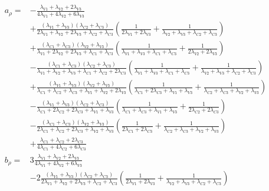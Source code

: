 {\small
\begin{align*}
    a_{\rho}=&-\frac{\lambda_{V1}+\lambda_{V2}+2\lambda_{V3}}{4\lambda_{V1}+4\lambda_{V2}+6\lambda_{V3}}\\
    &+\frac{\left(\lambda_{V1}+\lambda_{V3}\right)\left(\lambda_{C2}+\lambda_{C3}\right)}{2\lambda_{V1}+\lambda_{V2}+2\lambda_{V3}+\lambda_{C2}+\lambda_{C3}}\left(\frac{1}{2\lambda_{V1}+2\lambda_{V3}}+\frac{1}{\lambda_{V2}+\lambda_{V3}+\lambda_{C2}+\lambda_{C3}}\right)\\
    &+\frac{\left(\lambda_{C1}+\lambda_{C3}\right)\left(\lambda_{V2}+\lambda_{V3}\right)}{\lambda_{V1}+2\lambda_{V2}+2\lambda_{V3}+\lambda_{C1}+\lambda_{C3}}\left(\frac{1}{\lambda_{V1}+\lambda_{V3}+\lambda_{C1}+\lambda_{C3}}+\frac{1}{2\lambda_{V2}+2\lambda_{V3}}\right)\\
    &-\frac{\left(\lambda_{C1}+\lambda_{C3}\right)\left(\lambda_{C2}+\lambda_{C3}\right)}{\lambda_{V1}+\lambda_{V2}+\lambda_{V3}+\lambda_{C1}+\lambda_{C2}+2\lambda_{C3}}\left(\frac{1}{\lambda_{V1}+\lambda_{V3}+\lambda_{C1}+\lambda_{C3}}+\frac{1}{\lambda_{V2}+\lambda_{V3}+\lambda_{C2}+\lambda_{C3}}\right)\\
    &+\frac{\left(\lambda_{V1}+\lambda_{V3}\right)\left(\lambda_{V2}+\lambda_{V3}\right)}{\lambda_{C1}+\lambda_{C2}+\lambda_{C3}+\lambda_{V1}+\lambda_{V2}+2\lambda_{V3}}\left(\frac{1}{\lambda_{C1}+2\lambda_{C3}+\lambda_{V1}+\lambda_{V3}}+\frac{1}{\lambda_{C2}+\lambda_{C3}+\lambda_{V2}+\lambda_{V3}}\right)\\
    &-\frac{\left(\lambda_{V1}+\lambda_{V3}\right)\left(\lambda_{C2}+\lambda_{C3}\right)}{\lambda_{C1}+2\lambda_{C2}+2\lambda_{C3}+\lambda_{V1}+\lambda_{V3}}\left(\frac{1}{\lambda_{C1}+\lambda_{C3}+\lambda_{V1}+\lambda_{V3}}+\frac{1}{2\lambda_{C2}+2\lambda_{C3}}\right)\\
    &-\frac{\left(\lambda_{C1}+\lambda_{C3}\right)\left(\lambda_{V2}+\lambda_{V3}\right)}{2\lambda_{C1}+\lambda_{C2}+2\lambda_{C3}+\lambda_{V2}+\lambda_{V3}}\left(\frac{1}{2\lambda_{C1}+2\lambda_{C3}}+\frac{1}{\lambda_{C2}+\lambda_{C3}+\lambda_{V2}+\lambda_{V3}}\right)\\
    &+\frac{\lambda_{C1}+\lambda_{C2}+2\lambda_{C3}}{4\lambda_{C1}+4\lambda_{C2}+6\lambda_{C3}}\\
    b_{\rho}=&3\frac{\lambda_{V1}+\lambda_{V2}+2\lambda_{V3}}{4\lambda_{V1}+4\lambda_{V2}+6\lambda_{V3}}\\
    &-2\frac{\left(\lambda_{V1}+\lambda_{V3}\right)\left(\lambda_{C2}+\lambda_{C3}\right)}{2\lambda_{V1}+\lambda_{V2}+2\lambda_{V3}+\lambda_{C2}+\lambda_{C3}}\left(\frac{1}{2\lambda_{V1}+2\lambda_{V3}}+\frac{1}{\lambda_{V2}+\lambda_{V3}+\lambda_{C2}+\lambda_{C3}}\right)\\

\end{align*}}
